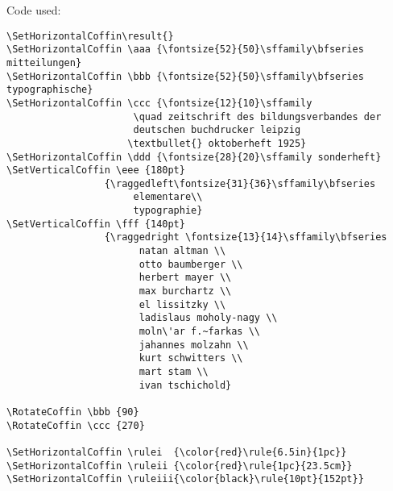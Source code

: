 \documentclass{article}
\begin{document}
\begin{center}
  \null
\end{center}

\newpage

\TypesetCoffin \result

\newpage

\vspace*{3cm}
\begin{center}
  {\Large Code used: \par}
\vspace*{1cm}


\begin{minipage}{14cm}
\begin{verbatim}
\SetHorizontalCoffin\result{}
\SetHorizontalCoffin \aaa {\fontsize{52}{50}\sffamily\bfseries mitteilungen}
\SetHorizontalCoffin \bbb {\fontsize{52}{50}\sffamily\bfseries typographische}
\SetHorizontalCoffin \ccc {\fontsize{12}{10}\sffamily
                      \quad zeitschrift des bildungsverbandes der
                      deutschen buchdrucker leipzig
                     \textbullet{} oktoberheft 1925}
\SetHorizontalCoffin \ddd {\fontsize{28}{20}\sffamily sonderheft}
\SetVerticalCoffin \eee {180pt}
                 {\raggedleft\fontsize{31}{36}\sffamily\bfseries
                      elementare\\
                      typographie}
\SetVerticalCoffin \fff {140pt}
                 {\raggedright \fontsize{13}{14}\sffamily\bfseries
                       natan altman \\
                       otto baumberger \\
                       herbert mayer \\
                       max burchartz \\
                       el lissitzky \\
                       ladislaus moholy-nagy \\
                       moln\'ar f.~farkas \\
                       jahannes molzahn \\
                       kurt schwitters \\
                       mart stam \\
                       ivan tschichold}

\RotateCoffin \bbb {90}
\RotateCoffin \ccc {270}

\SetHorizontalCoffin \rulei  {\color{red}\rule{6.5in}{1pc}}
\SetHorizontalCoffin \ruleii {\color{red}\rule{1pc}{23.5cm}}
\SetHorizontalCoffin \ruleiii{\color{black}\rule{10pt}{152pt}}


\end{verbatim}
\end{minipage}
\end{center}
\end{document}
